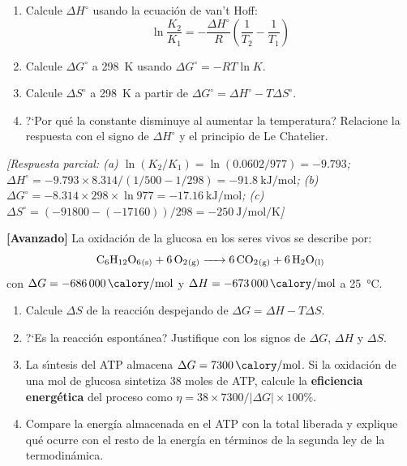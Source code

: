 \begin{bloque_ejercicios}
\begin{ejercicios}
\begin{enumerate}[label=\alph*)]
    \item Calcule $\Delta H^\circ$ usando la ecuaci\'on de
          van't Hoff:
          \[
              \ln\frac{K_2}{K_1} = -\frac{\Delta H^\circ}{R}
              \left(\frac{1}{T_2}-\frac{1}{T_1}\right)
          \]
    \item Calcule $\Delta G^\circ$ a \SI{298}{\kelvin}
          usando $\Delta G^\circ = -RT\ln K$.
    \item Calcule $\Delta S^\circ$ a \SI{298}{\kelvin}
          a partir de $\Delta G^\circ = \Delta H^\circ -T\Delta S^\circ$.
    \item ?`Por qu\'e la constante disminuye al aumentar la
          temperatura? Relacione la respuesta con el signo de
          $\Delta H^\circ$ y el principio de Le Chatelier.
\end{enumerate}

\textit{[Respuesta parcial:
(a) $\ln(K_2/K_1) = \ln(0.0602/977) = -9.793$;
$\Delta H^\circ = -9.793\times8.314/
(1/500-1/298) = \SI{-91.8}{\kilo\joule\per\mole}$;
(b) $\Delta G^\circ = -8.314\times298\times\ln977
= \SI{-17.16}{\kilo\joule\per\mole}$;
(c) $\Delta S^\circ = (-91800-(-17160))/298
= \SI{-250}{\joule\per\mole\per\kelvin}$]}

\item \textbf{[Avanzado]} La oxidaci\'on de la glucosa en los
seres vivos se describe por:
\[
    \ce{C6H12O6_{(s)} + 6O2_{(g)} -> 6CO2_{(g)} + 6H2O_{(l)}}
\]
con $\Delta G = \SI{-686000}{\calory\per\mole}$ y
$\Delta H = \SI{-673000}{\calory\per\mole}$ a \SI{25}{\celsius}.

\begin{enumerate}[label=\alph*)]
    \item Calcule $\Delta S$ de la reacci\'on despejando de
          $\Delta G = \Delta H - T\Delta S$.
    \item ?`Es la reacci\'on espont\'anea? Justifique con los
          signos de $\Delta G$, $\Delta H$ y $\Delta S$.
    \item La s\'{\i}ntesis del ATP almacena
          $\Delta G = \SI{+7300}{\calory\per\mole}$.
          Si la oxidaci\'on de una mol de glucosa
          sintetiza 38 moles de ATP, calcule la
          \textbf{eficiencia energ\'etica} del proceso
          como $\eta = 38\times7300/|\Delta G|\times100\%$.
    \item Compare la energ\'ia almacenada en el ATP con la
          total liberada y explique qu\'e ocurre con el
          resto de la energ\'ia en t\'erminos de la
          segunda ley de la termodin\'amica.
\end{enumerate}


\end{ejercicios}
\end{bloque_ejercicios}
